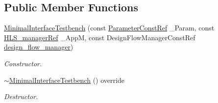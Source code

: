 \subsection*{Public Member Functions}
\begin{DoxyCompactItemize}
\item 
\hyperlink{classMinimalInterfaceTestbench_a343f1d02af2a054ebd81ab80dcc55fb9}{Minimal\+Interface\+Testbench} (const \hyperlink{Parameter_8hpp_a37841774a6fcb479b597fdf8955eb4ea}{Parameter\+Const\+Ref} \+\_\+\+Param, const \hyperlink{hls__manager_8hpp_acd3842b8589fe52c08fc0b2fcc813bfe}{H\+L\+S\+\_\+manager\+Ref} \+\_\+\+AppM, const Design\+Flow\+Manager\+Const\+Ref \hyperlink{classDesignFlowStep_ab770677ddf087613add30024e16a5554}{design\+\_\+flow\+\_\+manager})
\begin{DoxyCompactList}\small\item\em Constructor. \end{DoxyCompactList}\item 
\hyperlink{classMinimalInterfaceTestbench_a0281d137331c6c64fb987a1fe30c7d28}{$\sim$\+Minimal\+Interface\+Testbench} () override
\begin{DoxyCompactList}\small\item\em Destructor. \end{DoxyCompactList}\end{DoxyCompactItemize}
